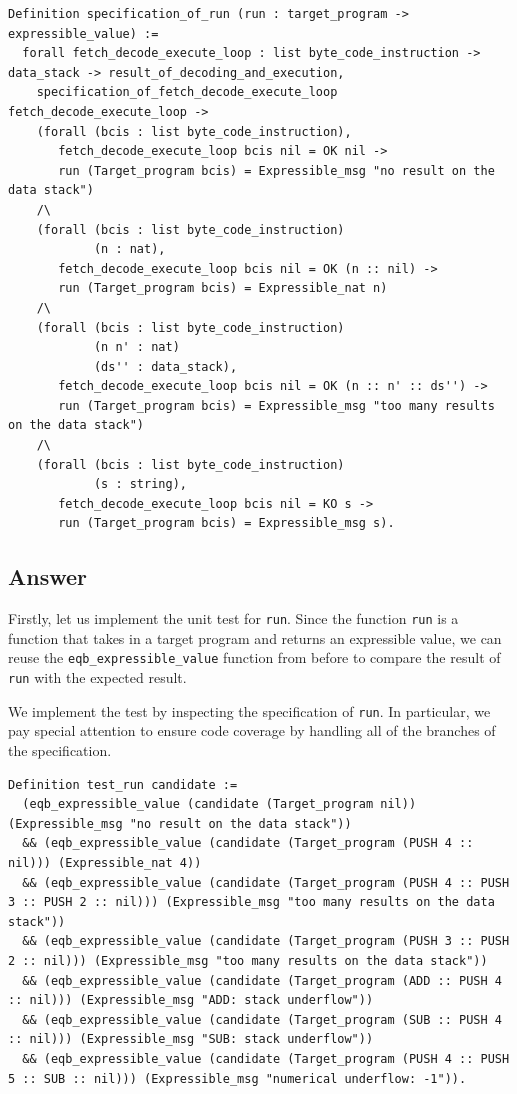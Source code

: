 \documentclass{article}
\begin{document}
\begin{lstlisting}
Definition specification_of_run (run : target_program -> expressible_value) :=
  forall fetch_decode_execute_loop : list byte_code_instruction -> data_stack -> result_of_decoding_and_execution,
    specification_of_fetch_decode_execute_loop fetch_decode_execute_loop ->
    (forall (bcis : list byte_code_instruction),
       fetch_decode_execute_loop bcis nil = OK nil ->
       run (Target_program bcis) = Expressible_msg "no result on the data stack")
    /\
    (forall (bcis : list byte_code_instruction)
            (n : nat),
       fetch_decode_execute_loop bcis nil = OK (n :: nil) ->
       run (Target_program bcis) = Expressible_nat n)
    /\
    (forall (bcis : list byte_code_instruction)
            (n n' : nat)
            (ds'' : data_stack),
       fetch_decode_execute_loop bcis nil = OK (n :: n' :: ds'') ->
       run (Target_program bcis) = Expressible_msg "too many results on the data stack")
    /\
    (forall (bcis : list byte_code_instruction)
            (s : string),
       fetch_decode_execute_loop bcis nil = KO s ->
       run (Target_program bcis) = Expressible_msg s).
\end{lstlisting}

\subsection{Answer}

Firstly, let us implement the unit test for \texttt{run}. Since the function \texttt{run} is a function that takes in a target program and returns an expressible value, we can reuse the \texttt{eqb\_expressible\_value} function from before to compare the result of \texttt{run} with the expected result.

We implement the test by inspecting the specification of \texttt{run}. In particular, we pay special attention to ensure code coverage by handling all of the branches of the specification. 

\begin{lstlisting}
Definition test_run candidate :=
  (eqb_expressible_value (candidate (Target_program nil)) (Expressible_msg "no result on the data stack"))
  && (eqb_expressible_value (candidate (Target_program (PUSH 4 :: nil))) (Expressible_nat 4))
  && (eqb_expressible_value (candidate (Target_program (PUSH 4 :: PUSH 3 :: PUSH 2 :: nil))) (Expressible_msg "too many results on the data stack"))
  && (eqb_expressible_value (candidate (Target_program (PUSH 3 :: PUSH 2 :: nil))) (Expressible_msg "too many results on the data stack"))
  && (eqb_expressible_value (candidate (Target_program (ADD :: PUSH 4 :: nil))) (Expressible_msg "ADD: stack underflow"))
  && (eqb_expressible_value (candidate (Target_program (SUB :: PUSH 4 :: nil))) (Expressible_msg "SUB: stack underflow"))
  && (eqb_expressible_value (candidate (Target_program (PUSH 4 :: PUSH 5 :: SUB :: nil))) (Expressible_msg "numerical underflow: -1")).
\end{lstlisting}
\end{document}
